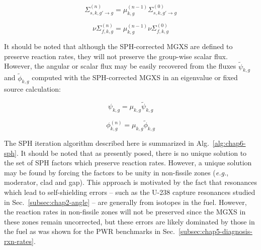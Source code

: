 \begin{dmath}
\label{eqn:chap6-sph-update-sigs}
\Sigma_{s,k,g'\rightarrow g}^{(n)} = \mu_{k,g}^{(n-1)}\Sigma_{s,k,g'\rightarrow g}^{(0)}
\end{dmath}

\begin{dmath}
\label{eqn:chap6-sph-update-nusigf}
\nu\Sigma_{f,k,g}^{(n)} = \mu_{k,g}^{(n-1)}\nu\Sigma_{f,k,g}^{(0)}
\end{dmath}

It should be noted that although the \ac{SPH}-corrected \ac{MGXS} are defined to preserve reaction rates, they will not preserve the group-wise scalar flux. However, the angular or scalar flux may be easily recovered from the fluxes $\tilde{\psi}_{k,g}$ and $\tilde{\phi}_{k,g}$ computed with the \ac{SPH}-corrected \ac{MGXS} in an eigenvalue or fixed source calculation:

\begin{dmath}
\label{eqn:chap6-sph-update-angular-flux}
\psi_{k,g} = \mu_{k,g}\tilde{\psi}_{k,g}
\end{dmath}

\begin{dmath}
\label{eqn:chap6-sph-update-scalar-flux}
\phi_{k,g}^{(n)} = \mu_{k,g}\tilde{\phi}_{k,g}
\end{dmath}

The \ac{SPH} iteration algorithm described here is summarized in Alg.~\ref{alg:chap6-sph}. It should be noted that as presently posed, there is no unique solution to the set of \ac{SPH} factors which preserve reaction rates. However, a unique solution may be found by forcing the factors to be unity in non-fissile zones (\textit{e.g.}, moderator, clad and gap). This approach is motivated by the fact that resonances which lead to self-shielding errors -- such as the U-238 capture resonances studied in Sec.~\ref{subsec:chap2-angle} -- are generally from isotopes in the fuel. However, the reaction rates in non-fissile zones will not be preserved since the \ac{MGXS} in these zones remain uncorrected, but these errors are likely dominated by those in the fuel as was shown for the \ac{PWR} benchmarks in Sec.~\ref{subsec:chap5-diagnosis-rxn-rates}.

